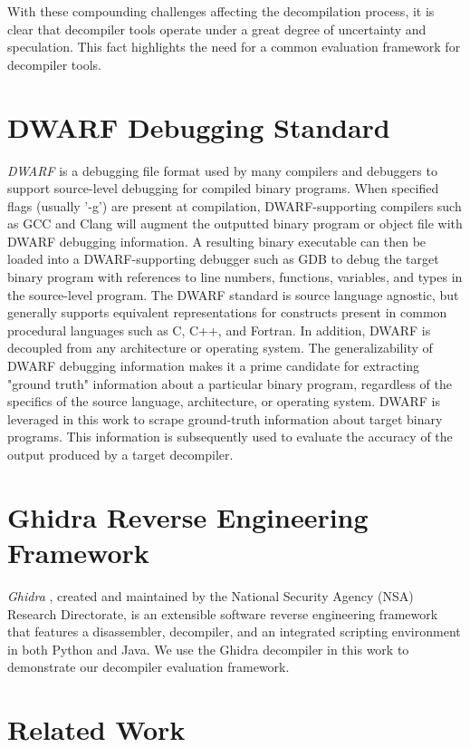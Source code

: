 With these compounding challenges affecting the decompilation process, it is clear that decompiler tools operate under a great degree of uncertainty and speculation. This fact highlights the need for a common evaluation framework for decompiler tools.

\section{DWARF Debugging Standard}

\emph{DWARF} \cite{bib:dwarf} is a debugging file format used by many compilers and debuggers to support source-level debugging for compiled binary programs. When specified flags (usually '-g') are present at compilation, DWARF-supporting compilers such as GCC and Clang will augment the outputted binary program or object file with DWARF debugging information. A resulting binary executable can then be loaded into a DWARF-supporting debugger such as GDB to debug the target binary program with references to line numbers, functions, variables, and types in the source-level program. The DWARF standard is source language agnostic, but generally supports equivalent representations for constructs present in common procedural languages such as C, C++, and Fortran. In addition, DWARF is decoupled from any architecture or operating system. The generalizability of DWARF debugging information makes it a prime candidate for extracting "ground truth" information about a particular binary program, regardless of the specifics of the source language, architecture, or operating system. DWARF is leveraged in this work to scrape ground-truth information about target binary programs. This information is subsequently used to evaluate the accuracy of the output produced by a target decompiler.

\section{Ghidra Reverse Engineering Framework}

\emph{Ghidra} \cite{bib:ghidra}, created and maintained by the National Security Agency (NSA) Research Directorate, is an extensible software reverse engineering framework that features a disassembler, decompiler, and an integrated scripting environment in both Python and Java. We use the Ghidra decompiler in this work to demonstrate our decompiler evaluation framework.

\section{Related Work}

